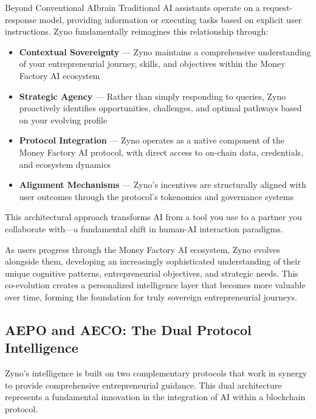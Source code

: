 \begin{mfai-box}{Beyond Conventional AI}{brain}
Traditional AI assistants operate on a request-response model, providing information or executing tasks based on explicit user instructions. Zyno fundamentally reimagines this relationship through:

\begin{itemize}
    \item \textbf{Contextual Sovereignty} — Zyno maintains a comprehensive understanding of your entrepreneurial journey, skills, and objectives within the Money Factory AI ecosystem
    
    \item \textbf{Strategic Agency} — Rather than simply responding to queries, Zyno proactively identifies opportunities, challenges, and optimal pathways based on your evolving profile
    
    \item \textbf{Protocol Integration} — Zyno operates as a native component of the Money Factory AI protocol, with direct access to on-chain data,  credentials, and ecosystem dynamics
    
    \item \textbf{Alignment Mechanisms} — Zyno's incentives are structurally aligned with user outcomes through the protocol's tokenomics and governance systems
\end{itemize}

This architectural approach transforms AI from a tool you use to a partner you collaborate with—a fundamental shift in human-AI interaction paradigms.
\end{mfai-box}

As users progress through the Money Factory AI ecosystem, Zyno evolves alongside them, developing an increasingly sophisticated understanding of their unique cognitive patterns, entrepreneurial objectives, and strategic needs. This co-evolution creates a personalized intelligence layer that becomes more valuable over time, forming the foundation for truly sovereign entrepreneurial journeys.

\subsection{AEPO and AECO: The Dual Protocol Intelligence}

Zyno's intelligence is built on two complementary protocols that work in synergy to provide comprehensive entrepreneurial guidance. This dual architecture represents a fundamental innovation in the integration of AI within a blockchain protocol.

